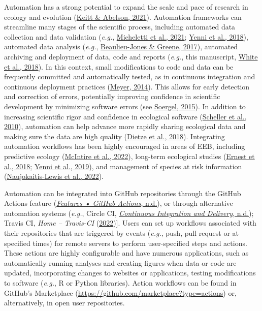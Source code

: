 Automation has a strong potential to expand the scale and pace of research in ecology and evolution (\protect\hyperlink{ref-cfgXxgt1}{Keitt \& Abelson, 2021}).
Automation frameworks can streamline many stages of the scientific process, including automated data collection and data validation (\emph{e.g.}, \protect\hyperlink{ref-bhDgD6lF}{Micheletti et al., 2021}; \protect\hyperlink{ref-lXvpQxeN}{Yenni et al., 2018}), automated data analysis (\emph{e.g.}, \protect\hyperlink{ref-Qh7xTLwz}{Beaulieu-Jones \& Greene, 2017}), automated archiving and deployment of data, code and reports (\emph{e.g.}, this manuscript, \protect\hyperlink{ref-SirQKFIz}{White et al., 2018}).
In this context, small modifications to code and data can be frequently committed and automatically tested, as in continuous integration and continuous deployment practices (\protect\hyperlink{ref-1Ep9EJL6y}{Meyer, 2014}).
This allows for early detection and correction of errors, potentially improving confidence in scientific development by minimizing software errors (see \protect\hyperlink{ref-ufw0ZdnI}{Soergel, 2015}).
In addition to increasing scientific rigor and confidence in ecological software (\protect\hyperlink{ref-12103x16N}{Scheller et al., 2010}), automation can help advance more rapidly sharing ecological data and making sure the data are high quality (\protect\hyperlink{ref-rTbinQMj}{Dietze et al., 2018}).
Integrating automation workflows has been highly encouraged in areas of EEB, including predictive ecology (\protect\hyperlink{ref-mmCOSRfr}{McIntire et al., 2022}), long-term ecological studies (\protect\hyperlink{ref-RxK4CmfR}{Ernest et al., 2018}; \protect\hyperlink{ref-1CJo8lo2v}{Yenni et al., 2019}), and management of species at risk information (\protect\hyperlink{ref-kZzfmBNu}{Naujokaitis-Lewis et al., 2022}).

Automation can be integrated into GitHub repositories through the GitHub Actions feature (\protect\hyperlink{ref-NUXbp429}{\emph{Features • GitHub Actions}, n.d.}), or through alternative automation systems (\emph{e.g.}, Circle CI, \protect\hyperlink{ref-T03Api6e}{\emph{Continuous Integration and Delivery}, n.d.}); Travis CI, \emph{Home -- Travis-CI} (\protect\hyperlink{ref-YeFSbfFV}{2022}){]}.
Users can set up workflows associated with their repositories that are triggered by events (\emph{e.g.}, push, pull request or at specified times) for remote servers to perform user-specified steps and actions.
These actions are highly configurable and have numerous applications, such as automatically running analyses and creating figures when data or code are updated, incorporating changes to websites or applications, testing modifications to software (\emph{e.g.}, R or Python libraries).
Action workflows can be found in GitHub's Marketplace (\url{https://github.com/marketplace?type=actions}) or, alternatively, in open user repositories.


